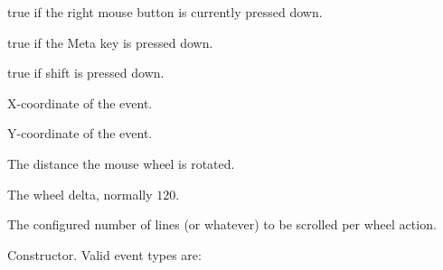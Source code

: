 \label{wxmouseeventmrightdown}


true if the right mouse button is currently pressed down.


\label{wxmouseeventmmetadown}


true if the Meta key is pressed down.


\label{wxmouseeventmshiftdown}


true if shift is pressed down.


\label{wxmouseeventmx}


X-coordinate of the event.


\label{wxmouseeventmy}


Y-coordinate of the event.


\label{wxmouseeventmwheelrotation}


The distance the mouse wheel is rotated.


\label{wxmouseeventmwheeldelta}


The wheel delta, normally $120$.


\label{wxmouseeventmlinesperaction}


The configured number of lines (or whatever) to be scrolled per wheel
action.



\label{wxmouseeventctor}


Constructor. Valid event types are:

